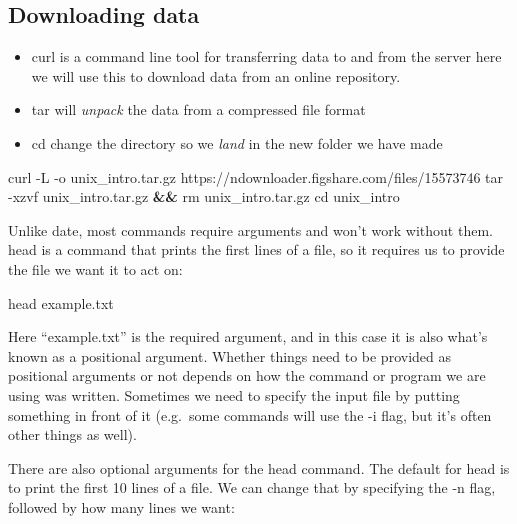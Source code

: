 \documentclass[
]{book}
\newenvironment{Shaded}{\begin{snugshade}}{\end{snugshade}}
\newcommand{\AttributeTok}[1]{\textcolor[rgb]{0.77,0.63,0.00}{#1}}
\newcommand{\BuiltInTok}[1]{#1}
\newcommand{\ExtensionTok}[1]{#1}
\newcommand{\FunctionTok}[1]{\textcolor[rgb]{0.00,0.00,0.00}{#1}}
\newcommand{\KeywordTok}[1]{\textcolor[rgb]{0.13,0.29,0.53}{\textbf{#1}}}
\newcommand{\NormalTok}[1]{#1}
\begin{document}
\hypertarget{downloading-data}{%
\subsection{Downloading data}\label{downloading-data}}

\begin{itemize}
\item
  curl is a command line tool for transferring data to and from the server here we will use this to download data from an online repository.
\item
  tar will \emph{unpack} the data from a compressed file format
\item
  cd change the directory so we \emph{land} in the new folder we have made
\end{itemize}

\begin{Shaded}
\begin{Highlighting}[]
    \ExtensionTok{curl} \AttributeTok{{-}L} \AttributeTok{{-}o}\NormalTok{ unix\_intro.tar.gz https://ndownloader.figshare.com/files/15573746}
    \FunctionTok{tar} \AttributeTok{{-}xzvf}\NormalTok{ unix\_intro.tar.gz }\KeywordTok{\&\&} \FunctionTok{rm}\NormalTok{ unix\_intro.tar.gz}
    \BuiltInTok{cd}\NormalTok{ unix\_intro}
\end{Highlighting}
\end{Shaded}

Unlike date, most commands require arguments and won't work without them. head is a command that prints the first lines of a file, so it requires us to provide the file we want it to act on:

\begin{Shaded}
\begin{Highlighting}[]
    \FunctionTok{head}\NormalTok{ example.txt}
\end{Highlighting}
\end{Shaded}

Here ``example.txt'' is the required argument, and in this case it is also what's known as a positional argument. Whether things need to be provided as positional arguments or not depends on how the command or program we are using was written. Sometimes we need to specify the input file by putting something in front of it (e.g.~some commands will use the -i flag, but it's often other things as well).

There are also optional arguments for the head command. The default for head is to print the first 10 lines of a file. We can change that by specifying the -n flag, followed by how many lines we want:
\end{document}
